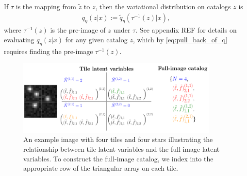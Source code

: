 If $\tau$ is the mapping from $\tilde z$ to $z$, 
then the variational distribution on catalogs $z$ is
\begin{align}
    q_\eta(z | x) := \tilde q_\eta(\tau^{-1}(z) | x),
    \label{eq:pull_back_of_q}
\end{align}
where $\tau^{-1}(z)$ is the pre-image of $z$ under $\tau$. 
See appendix REF for details on evaluating $q_\eta(z | x)$ for any given catalog $z$, which by \eqref{eq:pull_back_of_q} requires finding the pre-image $\tau^{-1}(z)$.







\begin{figure}[tb]
    \centering
    \includegraphics[width = 0.9\textwidth]{figures/vi_figures/tile_to_full_schematic.png}
    \vspace{-0.7cm}
    \caption{An example image with four tiles and four stars illustrating the relationship between tile latent variables and the full-image latent variables. 
    To construct the full-image catalog, we index into the appropriate row of the triangular array on each tile.}
    \label{fig:tile_to_full_schm}
\end{figure}


